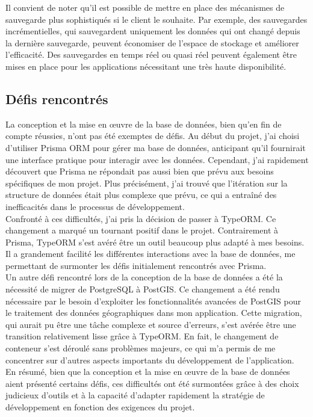 Il convient de noter qu'il est possible de mettre en place des mécanismes de sauvegarde plus sophistiqués si le client le souhaite.
Par exemple, des sauvegardes incrémentielles, qui sauvegardent uniquement les données qui ont changé depuis la dernière sauvegarde, peuvent économiser de l'espace de stockage et améliorer l'efficacité.
Des sauvegardes en temps réel ou quasi réel peuvent également être mises en place pour les applications nécessitant une très haute disponibilité.\\

\subsection{Défis rencontrés}\label{subsec:challenges}
La conception et la mise en œuvre de la base de données, bien qu'en fin de compte réussies, n'ont pas été exemptes de défis.
Au début du projet, j'ai choisi d'utiliser Prisma ORM pour gérer ma base de données, anticipant qu'il fournirait une interface pratique pour interagir avec les données.
Cependant, j'ai rapidement découvert que Prisma ne répondait pas aussi bien que prévu aux besoins spécifiques de mon projet.
Plus précisément, j'ai trouvé que l'itération sur la structure de données était plus complexe que prévu, ce qui a entraîné des inefficacités dans le processus de développement.\\

Confronté à ces difficultés, j'ai pris la décision de passer à TypeORM. Ce changement a marqué un tournant positif dans le projet.
Contrairement à Prisma, TypeORM s'est avéré être un outil beaucoup plus adapté à mes besoins.
Il a grandement facilité les différentes interactions avec la base de données, me permettant de surmonter les défis initialement rencontrés avec Prisma.\\

Un autre défi rencontré lors de la conception de la base de données a été la nécessité de migrer de PostgreSQL à PostGIS.
Ce changement a été rendu nécessaire par le besoin d'exploiter les fonctionnalités avancées de PostGIS pour le traitement des données géographiques dans mon application.
Cette migration, qui aurait pu être une tâche complexe et source d'erreurs, s'est avérée être une transition relativement lisse grâce à TypeORM. En fait,
le changement de conteneur s'est déroulé sans problèmes majeurs, ce qui m'a permis de me concentrer sur d'autres aspects importants du développement de l'application.\\

En résumé, bien que la conception et la mise en œuvre de la base de données aient présenté certains défis,
ces difficultés ont été surmontées grâce à des choix judicieux d'outils et à la capacité d'adapter rapidement la stratégie
de développement en fonction des exigences du projet.\\